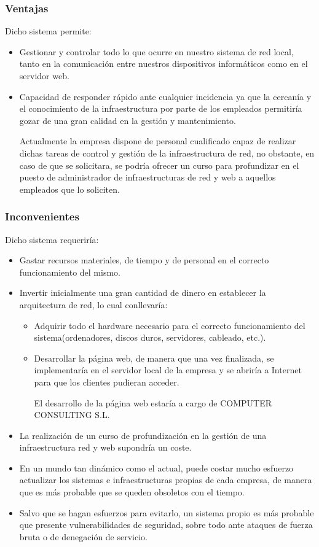 \documentclass[12pt,letterpaper]{article}
\begin{document}
			\subsubsection{Ventajas} 
	Dicho sistema permite:
				\begin{itemize}  
					\item Gestionar y controlar todo lo que ocurre en nuestro sistema de red local, tanto en la comunicación entre nuestros dispositivos informáticos como en el servidor web.
					\item Capacidad de responder rápido ante cualquier incidencia ya que la cercanía y el conocimiento de la infraestructura por parte de los empleados permitiría gozar de una gran calidad en la gestión y mantenimiento.\par
	Actualmente la empresa dispone de personal cualificado capaz de realizar dichas tareas de control y gestión de la infraestructura de red, no obstante, en caso de que se solicitara, se podría ofrecer un curso para profundizar en el puesto de administrador de infraestructuras de red y web a aquellos empleados que lo soliciten.
				\end{itemize}
	
			\subsubsection{Inconvenientes}
	Dicho sistema requeriría:
				\begin{itemize}  
					\item Gastar recursos materiales, de tiempo y de personal en el correcto funcionamiento del mismo.
					\item Invertir inicialmente una gran cantidad de dinero en establecer la arquitectura de red, lo cual conllevaría:
					\begin{itemize}  
						\item Adquirir todo el hardware necesario para el correcto funcionamiento del sistema(ordenadores, discos duros, servidores, cableado, etc.).
						\item Desarrollar la página web, de manera que una vez finalizada, se implementaría en el servidor local de la empresa y se abriría a Internet para que los clientes pudieran acceder.\par El desarrollo de la página web estaría a cargo de COMPUTER CONSULTING S.L. 
					\end{itemize}
					
					\item La realización de un curso de profundización en la gestión de una infraestructura red y web supondría un coste.
	
					\item En un mundo tan dinámico como el actual, puede costar mucho esfuerzo actualizar los sistemas e infraestructuras propias de cada empresa, de manera que es más probable que se queden obsoletos con el tiempo.
	
					\item Salvo que se hagan esfuerzos para evitarlo, un sistema propio  es más probable que presente vulnerabilidades de seguridad, sobre todo ante ataques de fuerza bruta o de denegación de servicio.
				\end{itemize}
	
\end{document}
